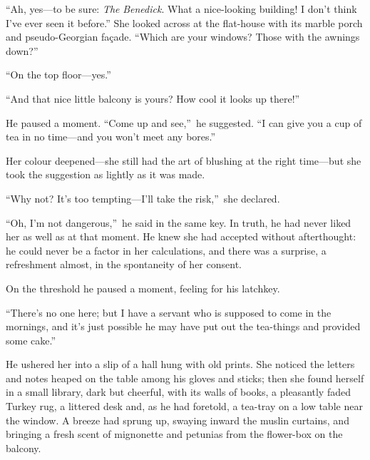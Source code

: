 \documentclass[12pt,a4paper]{book}
\begin{document}
``Ah, yes---to be sure: \textit{The} \textit{Benedick}. What a nice-looking building! 
I don't think I've ever seen it before.'' She looked across at the
flat-house with its marble porch and pseudo-Georgian fa\c{c}ade. 
``Which are your windows? Those with the awnings down?''





``On the top floor---yes.''





``And that nice little balcony is yours? How cool it looks up
there!''





He paused a moment. ``Come up and see,''\ he suggested. ``I can give
you a cup of tea in no time---and you won't meet any bores.''





Her colour deepened---she still had the art of blushing at the
right time---but she took the suggestion as lightly as it was
made.





``Why not? It's too tempting---I'll take the risk,''\ she declared.





``Oh, I'm not dangerous,''\ he said in the same key. In truth, he
had never liked her as well as at that moment. He knew she had
accepted without afterthought: he could never be a factor in her
calculations, and there was a surprise, a refreshment almost, in
the spontaneity of her consent.





On the threshold he paused a moment, feeling for his latchkey.





``There's no one here; but I have a servant who is supposed to
come in the mornings, and it's just possible he may have put out
the tea-things and provided some cake.''





He ushered her into a slip of a hall hung with old prints. She
noticed the letters and notes heaped on the table among his
gloves and sticks; then she found herself in a small library,
dark but cheerful, with its walls of books, a pleasantly faded
Turkey rug, a littered desk and, as he had foretold, a tea-tray
on a low table near the window. A breeze had sprung up, swaying
inward the muslin curtains, and bringing a fresh scent of
mignonette and petunias from the flower-box on the balcony.
\end{document}
